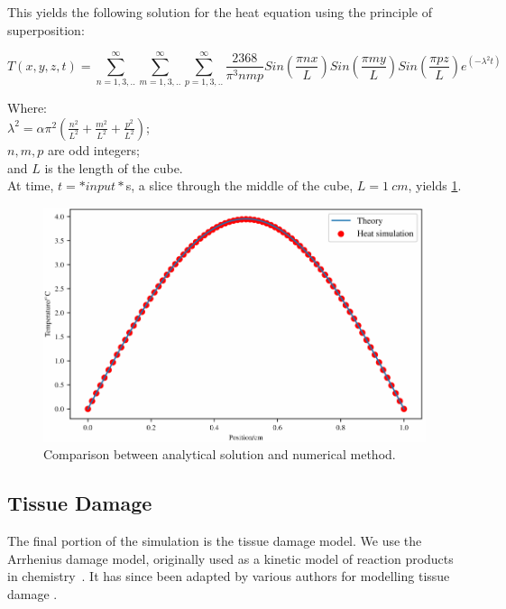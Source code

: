 This yields the following solution for the heat equation using the principle of superposition:

\begin{equation}
T(x,y,z,t)=\sum^\infty_{n=1,3,..}\sum^\infty_{m=1,3,..}\sum^\infty_{p=1,3,..}\frac{2368}{\pi^3nmp}Sin(\frac{\pi n x}{L})Sin(\frac{\pi m y}{L})Sin(\frac{\pi p z}{L})e^{(-\lambda^2t)}
\end{equation}

\noindent Where:\\
	\indent $\lambda^2=\alpha\pi^2(\tfrac{n^2}{L^2}+\tfrac{m^2}{L^2}+\tfrac{p^2}{L^2})$;\\
	\indent $n,m,p$ are odd integers;\\
	\indent and $L$ is the length of the cube.\\
	
At time, $t=*input*$s, a slice through the middle of the cube, $L=1~cm$,  yields \cref{fig:validation-heat}.

\begin{figure}	
\vspace{-10pt}
	\centering
	\includegraphics[width=\columnwidth]{./ablation/images/validation.pdf}
	\caption{Comparison between analytical solution and numerical method.}
	\label{fig:validation-heat}
	\vspace{-10pt}
\end{figure}	
	
	
\subsection{Tissue Damage}
\label{sec:tissuedamage}
The final portion of the simulation is the tissue damage model. We use the Arrhenius damage model, originally used as a kinetic model of reaction products in chemistry~\cite{pearce2009relationship}. It has since been adapted by various authors for modelling tissue damage \cite{hendriques1947studies,jiang2002effects}.

